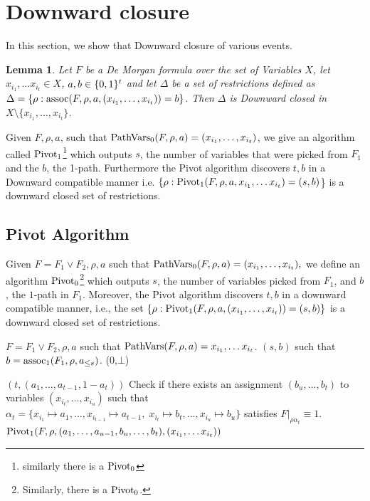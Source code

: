 \documentclass[11pt]{article}
\newtheorem{lemma}[theorem]{Lemma}
\begin{document}
\section{Downward closure}

In this section, we show that Downward closure of various events. 


\begin{lemma}
    Let $F$ be a De Morgan formula over the set of Variables $X$, let $x_{i_1}, \dots x_{i_t} \in X$, $a,b \in \{0,1\}^t$ and  
    let $\Delta$  be a set of restrictions defined as $\Delta =\{\rho: \operatorname{assoc}(F,\rho,a,(x_{i_1}, \dots , x_{i_t})) = b\}$. 
    Then $\Delta$ is Downward closed in $X \setminus \{x_{i_1},\dots , x_{i_t}\}$. 
\end{lemma}


Given $F,\rho,a$, such that $\operatorname{PathVars}_0(F,\rho, a) = (x_{i_1}, \dots , x_{i_t})$, we give an algorithm called $\operatorname{Pivot}_1$\footnote{similarly there is a $\operatorname{Pivot}_0$} which outputs $s$, the number of variables that were picked from $F_1$ and the $b$, the 1-path. 
Furthermore the Pivot algorithm discovers $t,b$ in a Downward compatible manner i.e.  $\{\rho: \operatorname{Pivot}_1(F,\rho,a,x_{i_{1}}, \dots x_{i_{t}}) = (s,b)$\} is a downward closed set of restrictions. 


\subsection{Pivot Algorithm}
Given $F = F_1 \lor F_2,\rho,a$ such that 
$\operatorname{PathVars}_0(F,\rho, a) = (x_{i_1}, \dots , x_{i_t}),$
we define an algorithm $\operatorname{Pivot}_0$\footnote{Similarly, there is a $\operatorname{Pivot}_0$.} 
which outputs $s$, the number of variables picked from $F_1$, and $b$, the $1$-path in $F_1$. Moreover, the Pivot algorithm discovers $t,b$ in a downward compatible manner, 
i.e., the set
$\{\rho : \operatorname{Pivot}_1(F,\rho,a,(x_{i_1}, \dots , x_{i_t})) = (s,b)\}$
is a downward closed set of restrictions.
\begin{algorithm}[H]
\caption{$\Pivot_1(F, \rho, a, (\varseq{1}t))$}
\begin{algorithmic}[1]
 $F = F_1 \lor F_2, \rho ,a$ such that $\operatorname{PathVars}(F,\rho,a) = x_{i_{1}}, \dots x_{i_{t}}$. 
 $(s,b)$ such that $b = \operatorname{assoc}_1(F_1,\rho,a_{\le s})$. 
    \State \Return (0,$\bot$)

\Else
    \State \Return $(t,(a_1,\dots,a_{t-1}, 1- a_t))$
    \Else
            \State Check if there exists an assignment $(b_u, \dots, b_t)$ to variables 
            $(x_{i_t}, \dots, x_{i_u})$ such that
            $\alpha_t = \{x_{i_1} \mapsto a_1, \dots, x_{i_{t-1}} \mapsto a_{t-1}, \;
            x_{i_t} \mapsto b_t, \dots, x_{i_u} \mapsto b_u \}$
        satisfies $F|_{\rho\alpha_t} \equiv 1$.
            \State \Return $\operatorname{Pivot}_1(F,\rho,(a_1, \dots,a_{u-1},b_u, \dots ,b_t), (x_{i_{1}}, \dots x_{i_{t}}))$
        \EndIf
    \EndFor
\EndIf
    \EndIf
\end{algorithmic}
\end{algorithm}
\end{document}
